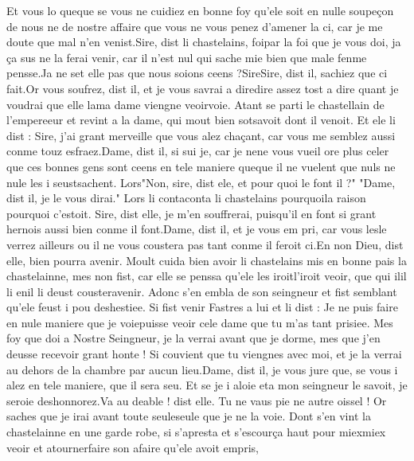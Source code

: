 \documentclass{article}
\begin{document}
\begin{pages}
      Et vous lo queque se vous ne cuidiez en 
      bonne foy qu’ele soit en nulle soupeçon de nous ne de nostre affaire que vous ne vous penez d’amener 
      la ci, car je me doute que mal n’en venist.Sire, dist li chastelains, 
      foipar la foi que je vous doi, ja ça sus ne la ferai venir, 
   car il n’est nul qui sache mie bien que male fenme pensse.Ja ne set elle pas que nous soions ceens ?SireSire, dist il, sachiez que ci fait.Or vous soufrez, dist il, et je vous savrai a 
      diredire assez tost a dire  
      quant je voudrai que elle 
      lama dame 
      viengne veoirvoie. \pend
\pstart Atant se parti le chastellain de 
   l’empereeur et revint a la dame, 
   qui mout bien sotsavoit dont il venoit. Et ele li dist :
   Sire, j’ai grant merveille que vous alez chaçant, car vous me semblez aussi conme touz esfraez.Dame, dist il, si sui je, 
      car je nene vous 
      vueil ore plus celer que ces bonnes gens sont ceens en tele maniere 
      queque il ne vuelent que 
      nuls ne nule les i seustsachent.
   Lors"Non, sire, dist ele, et pour quoi le font il ?"
      "Dame, dist il, je le vous dirai." Lors li 
   contaconta li chastelains 
   pourquoila raison pourquoi c'estoit.
   Sire, dist elle, je m’en souffrerai, puisqu’il en font si grant hernois 
      aussi bien conme il font.Dame, dist il, et je vous em pri, car vous 
      lesle verrez ailleurs ou il ne vous coustera pas tant conme il feroit ci.En non Dieu, dist elle, bien pourra avenir. \pend
\pstart Moult cuida bien avoir li chastelains mis en bonne pais 
   la chastelainne, mes non fist, car elle se penssa qu’ele 
   les iroitl'iroit veoir, que qui 
   ilil li enil li deust 
   cousteravenir. 
   Adonc s’en embla de son seingneur et 
   fist semblant qu’ele feust i pou deshestiee. 
   Si fist venir Fastres a lui et li dist :
   Je ne puis faire en nule maniere que je 
      voiepuisse veoir cele dame que tu m’as tant prisiee. 
   Mes foy que doi a Nostre Seingneur, je la verrai avant que je dorme, mes que j’en deusse recevoir grant honte ! 
   Si couvient que tu viengnes avec moi, et je la verrai au dehors de la chambre par aucun lieu.Dame, dist il, je vous jure que, se vous i alez en tele maniere, que il sera seu. 
      Et se je i aloie eta 
      mon seingneur le savoit, je seroie deshonnorez.Va au deable ! dist elle. Tu ne vaus pie ne autre oissel ! Or saches que je irai avant toute 
      seuleseule que je ne la voie.
   Dont s’en vint la chastelainne en une garde robe, si s’apresta et s’escourça haut 
   pour miexmiex veoir et 
   atournerfaire son afaire qu’ele avoit empris, 

\end{pages}
\end{document}

